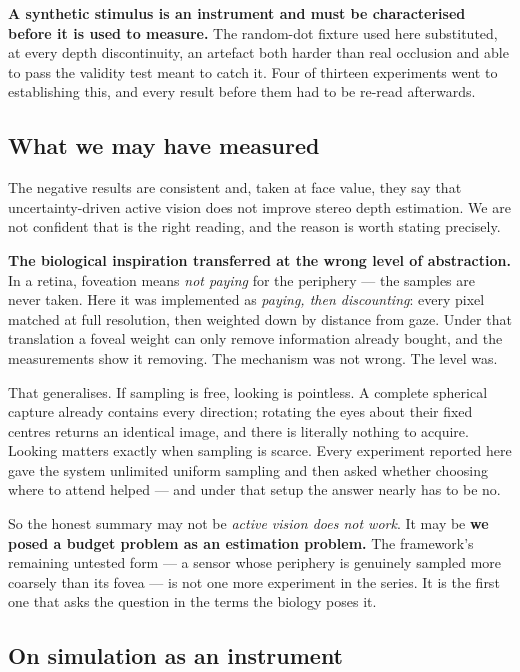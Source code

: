 \textbf{A synthetic stimulus is an instrument and must be characterised before
it is used to measure.} The random-dot fixture used here substituted, at every
depth discontinuity, an artefact both harder than real occlusion and able to
pass the validity test meant to catch it. Four of thirteen experiments went to
establishing this, and every result before them had to be re-read afterwards.

\subsection{What we may have measured}

The negative results are consistent and, taken at face value, they say that
uncertainty-driven active vision does not improve stereo depth estimation. We
are not confident that is the right reading, and the reason is worth stating
precisely.

\textbf{The biological inspiration transferred at the wrong level of
abstraction.} In a retina, foveation means \emph{not paying} for the periphery
--- the samples are never taken. Here it was implemented as \emph{paying, then
discounting}: every pixel matched at full resolution, then weighted down by
distance from gaze. Under that translation a foveal weight can only remove
information already bought, and the measurements show it removing. The mechanism
was not wrong. The level was.

That generalises. If sampling is free, looking is pointless. A complete
spherical capture already contains every direction; rotating the eyes about
their fixed centres returns an identical image, and there is literally nothing
to acquire. Looking matters exactly when sampling is scarce. Every experiment
reported here gave the system unlimited uniform sampling and then asked whether
choosing where to attend helped --- and under that setup the answer nearly has
to be no.

So the honest summary may not be \emph{active vision does not work}. It may be
\textbf{we posed a budget problem as an estimation problem.} The framework's
remaining untested form --- a sensor whose periphery is genuinely sampled more
coarsely than its fovea --- is not one more experiment in the series. It is the
first one that asks the question in the terms the biology poses it.

\subsection{On simulation as an instrument}

